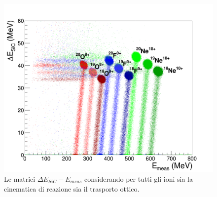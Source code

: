 


\begin{figure} [!p]
	\centering
	\includegraphics[width=\textwidth, keepaspectratio]{Grafici_Tesi2/PID/deltaE_Emeas_quadrata3.png}
	\caption{Le matrici $\Delta E_{SiC} - E_{meas}$ considerando per tutti gli ioni sia la cinematica di reazione sia il trasporto ottico.} \label{fig:deltaE_Emeas_PIDa}
\end{figure}


